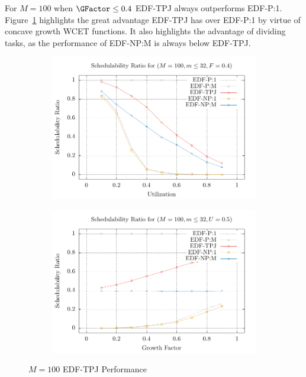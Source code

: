For ${M = 100}$ when ${\GFactor \le 0.4}$ EDF-TPJ always outperforms
EDF-P:1. Figure~\ref{fig:m100-tpj} highlights the great advantage
EDF-TPJ has over EDF-P:1 by virtue of concave growth WCET
functions. It also highlights the advantage of dividing tasks, as the
performance of EDF-NP:M is always below EDF-TPJ.

\begin{figure}[ht]
  \begin{subfigure}[t]{.5\linewidth}
    \includegraphics[width=\linewidth]{plot/2D-UFS/2D-M100m32F0_4xS}
  \end{subfigure}%
  \begin{subfigure}[t]{.5\linewidth}
    \includegraphics[width=\linewidth]{plot/2D-UFS/2D-M100m32U0_5xS}
  \end{subfigure}%
  \caption{${M = 100}$ EDF-TPJ Performance}
  \label{fig:m100-tpj}
\end{figure}

